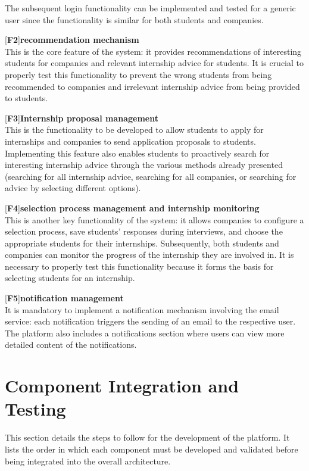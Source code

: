 	The subsequent login functionality can be implemented and tested for a generic user since the functionality is similar for both students and companies.
	
	[\textbf{F2}]\textbf{recommendation mechanism}\\
	This is the core feature of the system: it provides recommendations of interesting students for companies and relevant internship advice for students. It is crucial to properly test this functionality to prevent the wrong students from being recommended to companies and irrelevant internship advice from being provided to students.
	
	[\textbf{F3}]\textbf{Internship proposal management}\\
	This is the functionality to be developed to allow students to apply for internships and companies to send application proposals to students. Implementing this feature also enables students to proactively search for interesting internship advice through the various methods already presented (searching for all internship advice, searching for all companies, or searching for advice by selecting different options).
	
	[\textbf{F4}]\textbf{selection process management and internship monitoring}\\
	This is another key functionality of the system: it allows companies to configure a selection process, save students' responses during interviews, and choose the appropriate students for their internships. Subsequently, both students and companies can monitor the progress of the internship they are involved in. It is necessary to properly test this functionality because it forms the basis for selecting students for an internship.
	
	[\textbf{F5}]\textbf{notification management} \\
	It is mandatory to implement a notification mechanism involving the email service: each notification triggers the sending of an email to the respective user. The platform also includes a notifications section where users can view more detailed content of the notifications.
	
	\section{Component Integration and Testing}
	
	This section details the steps to follow for the development of the platform. It lists the order in which each component must be developed and validated before being integrated into the overall architecture.
	
	
	
	